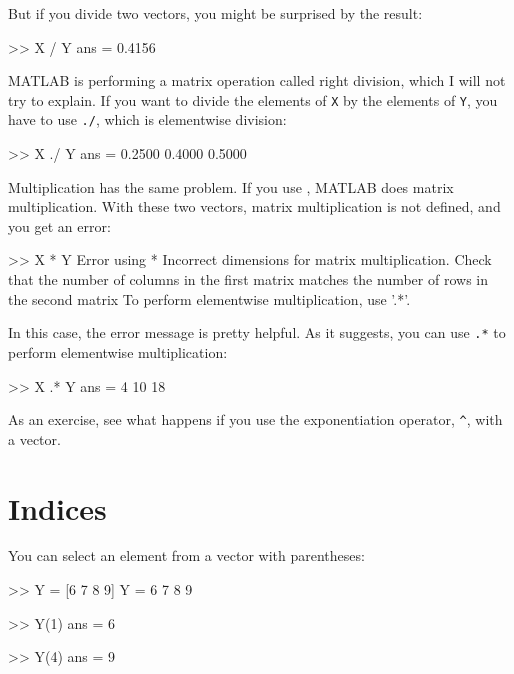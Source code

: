 \documentclass[
]{book}
\numberwithin{Answer}{chapter}
\numberwithin{Exercise}{chapter}
\begin{document}
But if you divide two vectors, you might be surprised by the result:

\begin{code}
>> X / Y
ans = 0.4156
\end{code}

MATLAB is performing a matrix operation called right division, which I will not try to explain.  If you want to divide the elements of {\tt X} by the elements of {\tt Y}, you have to use {\tt ./}, which is elementwise division:

\begin{code}
>> X ./ Y
ans = 0.2500    0.4000    0.5000
\end{code}

Multiplication has the same problem.  If you use {\tt *}, MATLAB does matrix multiplication.  With these two vectors, matrix multiplication is not defined, and you get an error:

\begin{code}
>> X * Y
Error using  * 
Incorrect dimensions for matrix multiplication. 
Check that the number of columns in the first matrix 
matches the number of rows in the second matrix
To perform elementwise multiplication, use '.*'.
\end{code}

In this case, the error message is pretty helpful.  As it suggests, you can use {\tt .*} to perform elementwise multiplication:


\begin{code}
>> X .* Y
ans = 4    10    18
\end{code}

As an exercise, see what happens if you use the exponentiation operator,
\verb"^", with a vector.


\section{Indices}


You can select an element from a vector with parentheses:

\begin{code}
>> Y = [6 7 8 9]
Y = 6    7     8     9

>> Y(1)
ans = 6

>> Y(4)
ans = 9
\end{code}
\end{document}
